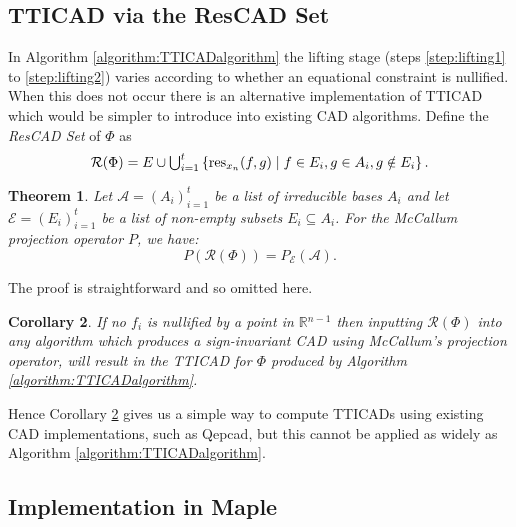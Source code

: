 \documentclass{article}
\def\R {\ensuremath{\mathbb{R}}}
\newtheorem{theorem}{Theorem}
\newtheorem{corollary}[theorem]{Corollary}
\begin{document}
\subsection{TTICAD via the ResCAD Set}

In Algorithm \ref{algorithm:TTICADalgorithm} the lifting stage (steps \ref{step:lifting1} to \ref{step:lifting2}) varies according to whether an equational constraint is nullified.  When this does not occur there is an alternative implementation of TTICAD which would be simpler to introduce into existing CAD algorithms.  
Define the {\em ResCAD Set} of $\Phi$ as
\begin{equation*}
  \mathcal{R}(\Phi) = E \cup {\textstyle \bigcup_{i=1}^t} \left\{ {\rm res}_{x_n}(f,g) \mid f\in E_i, g \in A_i, g \notin E_i \right\}.
\end{equation*}

\begin{theorem} \label{THEOREM:PROJEQUALSRES}
   Let $\mathcal{A} = ( A_i)_{i=1}^t$ be a list of irreducible bases $A_i$
and let $\mathcal{E} = ( E_i )_{i=1}^t$ be a list of non-empty subsets
$E_i \subseteq A_i$.   
  For the McCallum projection operator $P$, \cite{McCallum1988} we have:
  \begin{equation*}
    {P}(\mathcal{R}(\Phi)) = {P}_{\mathcal{E}}(\mathcal{A}).
  \end{equation*}
\end{theorem}
The proof is straightforward and so omitted here.  


\begin{corollary}\label{corollary:rescad}
If no $f_i$ is nullified by a point in $\R{}^{n-1}$ then inputting $\mathcal{R}(\Phi)$ into any algorithm which produces a sign-invariant CAD using McCallum's projection operator, will result in the TTICAD for $\Phi$ produced by Algorithm \ref{algorithm:TTICADalgorithm}.
\end{corollary}

Hence Corollary \ref{corollary:rescad} gives us a simple way to compute TTICADs using existing CAD implementations, such as {\sc Qepcad}, but this cannot be applied as widely as Algorithm \ref{algorithm:TTICADalgorithm}.

\subsection{Implementation in Maple} 
\label{MapleSec}
\end{document}
